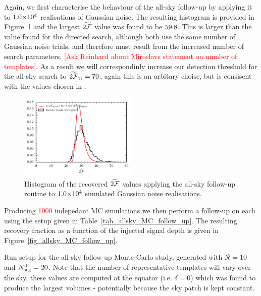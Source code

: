 \documentclass[aps, prd, twocolumn, superscriptaddress, floatfix, showpacs, nofootinbib, longbibliography]{revtex4-1}
\newcommand{\CHECK}[1]{\textcolor{red}{#1}}
\newcommand{\comment}[1]{\textcolor{red}{[#1]}}
\begin{document}
Again, we first characterise the behaviour of the all-sky follow-up by applying
it to $1.0{\times}10^{4}$ realisations of Gaussian noise. The resulting histogram
is provided in Figure~\ref{fig_hist_AllSkyMCNoiseOnly} and the largest $\widetilde{2{\mathcal{F}}}$
value was found to be $59.8$. This is larger than the
value found for the directed search, although both use the same number of
Gaussian noise trials, and therefore must result from the increased number of
search parameters. \comment{Ask Reinhard about Miroslavs statement on number of
templates}. As a result we will correspondinly increase our detection threshold
for the all-sky search to $\widetilde{2{\mathcal{F}}}_{\rm tr} = 70$; again this is an arbitary
choise, but is consisent with the values chosen in \citet{shaltev2013}.
\begin{figure}[htb]
\centering
\includegraphics[width=0.5\textwidth]{allsky_noise_twoF_histogram}
\caption{Histogram of the recovered $\widetilde{2{\mathcal{F}}}$ values applying the
all-sky follow-up routine to $1.0{\times}10^{4}$ simulated Gaussian noise
realisations.}
\label{fig_hist_AllSkyMCNoiseOnly}
\end{figure}

Producing \CHECK{1000} indepedant MC simulations we then perform a follow-up on
each using the setup given in Table~\ref{tab_allsky_MC_follow_up}. The
resulting recovery fraction as a function of the injected signal depth is given
in Figure~\ref{fig_allsky_MC_follow_up}.

\begin{table}[htb]
\caption{Run-setup for the all-sky follow-up Monte-Carlo study, generated with
$\mathcal{R}=10$ and $N_{\rm seg}^0=20$. Note that the number of representative
templates will vary over the sky, these values are computed at the equator
(i.e. $\delta=0$) which was found to produce the largest volumes - potentially
because the sky patch is kept constant.}
\label{tab_allsky_MC_follow_up}

\end{table}
\end{document}
